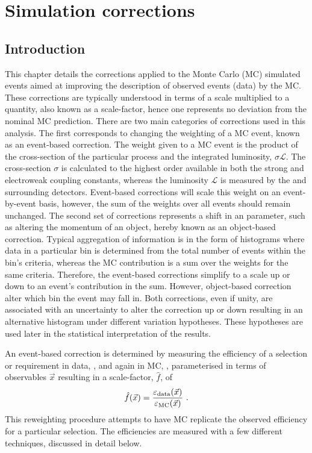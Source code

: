 \chapter{Simulation corrections}
\label{chap:simulation-corrections}


\section{Introduction}

This chapter details the corrections applied to the Monte Carlo (MC) simulated 
events aimed at improving the description of observed events (data) by the MC.
These corrections are typically understood in terms of a scale multiplied to a
quantity, also known as a scale-factor, hence one represents no deviation from
the nominal MC prediction. There are two main categories of corrections used
in this analysis. The first corresponds to changing the weighting of a MC
event, known as an event-based correction. The weight given to a MC event is
the product of the cross-section of the particular process and the integrated
luminosity, $\sigma \mathcal{L}$. The cross-section $\sigma$ is calculated to
the highest order available in both the strong and electroweak coupling
constants, whereas the luminosity $\mathcal{L}$ is measured by the \CMS and
surrounding detectors. Event-based corrections will scale this weight on an
event-by-event basis, however, the sum of the weights over all events should
remain unchanged. The second set of corrections represents a shift in an
parameter, such as altering the momentum of an object, hereby known as an
object-based correction. Typical aggregation of information is in the form of
histograms where data in a particular bin is determined from the total number
of events within the bin's criteria, whereas the MC contribution is a sum over
the weights for the same criteria. Therefore, the event-based corrections
simplify to a scale up or down to an event's contribution in the sum. However,
object-based correction alter which bin the event may fall in. Both
corrections, even if unity, are associated with an uncertainty to alter the
correction up or down resulting in an alternative histogram under different
variation hypotheses. These hypotheses are used later in the statistical
interpretation of the results.

An event-based correction is determined by measuring the efficiency of a
selection or requirement in data, \effdata, and again in MC, \effmc,
parameterised in terms of observables $\vec{x}$ resulting in a scale-factor,
$\hat{f}$, of
%
\begin{equation}
    \hat{f}(\vec{x}) = \frac{\varepsilon_{\mathrm{data}}(\vec{x})}{\varepsilon_{\mathrm{MC}}(\vec{x})}\ .
\end{equation}
%
This reweighting procedure attempts to have MC replicate the observed
efficiency for a particular selection. The efficiencies are measured with a
few different techniques, discussed in detail below.


